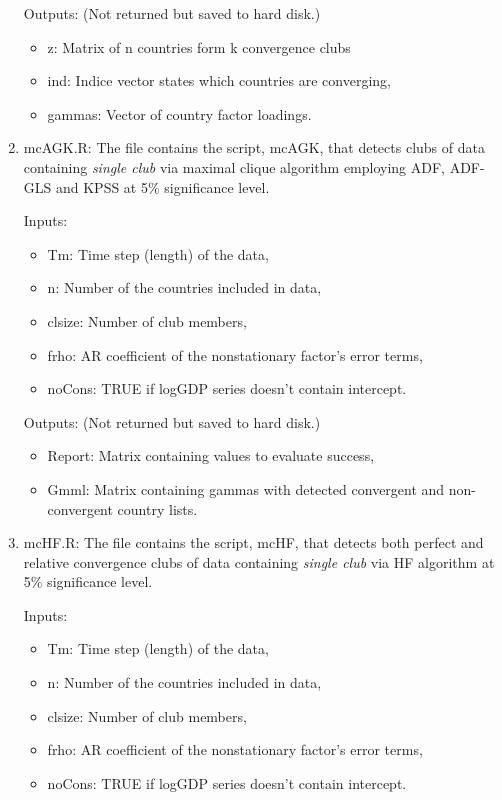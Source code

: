 \documentclass{article}
\begin{document}
\begin{enumerate}
	Outputs: (Not returned but saved to hard disk.)
	
	\begin{itemize}
		\item  z: Matrix of n countries form k convergence clubs
		\item  ind: Indice vector states which countries are converging,
		\item  gammas:  Vector of country factor loadings.  
	\end{itemize}		 
	\item mcAGK.R: The file contains the script, mcAGK, that detects clubs of data containing \textit{single club} via maximal clique algorithm employing ADF, ADF-GLS and KPSS at 5\% significance level.
	
		Inputs:
		\begin{itemize}
			
			\item Tm: Time step (length) of the data,
			\item n: Number of the countries included in data,
			\item clsize: Number of club members, 
			\item frho: AR coefficient of the nonstationary factor's error terms,
			\item noCons: TRUE if logGDP series doesn't contain intercept.
		\end{itemize}
		
		Outputs: (Not returned but saved to hard disk.)
		
		\begin{itemize}
		\item Report: Matrix containing values to evaluate success,
		\item Gmml: Matrix containing gammas with detected convergent and non-convergent country lists.
		\end{itemize}		 	
		
	\item mcHF.R: The file contains the script, mcHF, that detects both perfect and relative convergence clubs of data containing \textit{single club} via HF algorithm at 5\% significance level.
	
	Inputs:
	\begin{itemize}
		
		\item Tm: Time step (length) of the data,
		\item n: Number of the countries included in data,
		\item clsize: Number of club members, 
		\item frho: AR coefficient of the nonstationary factor's error terms,
		\item noCons: TRUE if logGDP series doesn't contain intercept.
	\end{itemize}
	

\end{enumerate}
\end{document}
